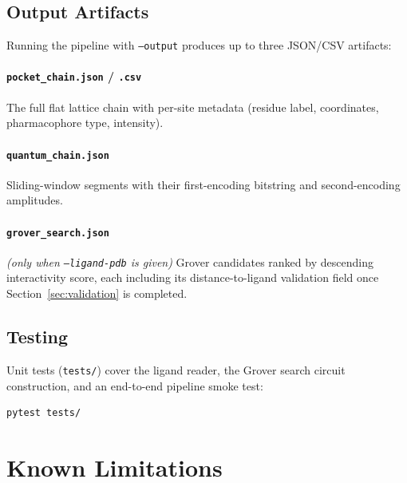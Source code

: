 \documentclass[11pt,a4paper]{article}
\begin{document}
\subsection{Output Artifacts}

Running the pipeline with \texttt{--output} produces up to three JSON/CSV artifacts:

\paragraph{\texttt{pocket\_chain.json} / \texttt{.csv}} The full flat lattice chain with per-site metadata (residue label, coordinates, pharmacophore type, intensity).

\paragraph{\texttt{quantum\_chain.json}} Sliding-window segments with their first-encoding bitstring and second-encoding amplitudes.

\paragraph{\texttt{grover\_search.json}} \emph{(only when \texttt{--ligand-pdb} is given)} Grover candidates ranked by descending interactivity score, each including its distance-to-ligand validation field once Section~\ref{sec:validation} is completed.

\subsection{Testing}

Unit tests (\texttt{tests/}) cover the ligand reader, the Grover search circuit construction, and an end-to-end pipeline smoke test:

\begin{lstlisting}[language=bash]
pytest tests/
\end{lstlisting}

\section{Known Limitations}
\end{document}
